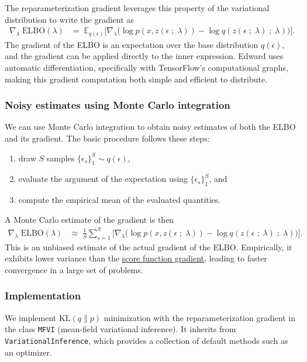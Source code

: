 The reparameterization gradient leverages this property of the
variational distribution to write the gradient as
\begin{align*}
  \nabla_\lambda\;
  \text{ELBO}(\lambda)
  &=\;
  \mathbb{E}_{q(\epsilon)}
  \big[
  \nabla_\lambda
  \big(
  \log p(x, z(\epsilon \;;\; \lambda))
  -
  \log q(z(\epsilon \;;\; \lambda) \;;\;\lambda)
  \big)
  \big].
\end{align*}
The gradient of the ELBO is an expectation over the base
distribution $q(\epsilon)$, and the gradient can be applied directly
to the inner expression.
Edward uses automatic differentiation, specifically with TensorFlow's
computational graphs, making this gradient computation both simple and
efficient to distribute.

\subsubsection{Noisy estimates using Monte Carlo integration}

We can use Monte Carlo integration to obtain noisy estimates of both the ELBO
and its gradient. The basic procedure follows these steps:
\begin{enumerate}
  \item draw $S$ samples $\{\epsilon_s\}_1^S \sim q(\epsilon)$,
  \item evaluate the argument of the expectation using $\{\epsilon_s\}_1^S$, and
  \item compute the empirical mean of the evaluated quantities.
\end{enumerate}

A Monte Carlo estimate of the gradient is then
\begin{align*}
  \nabla_\lambda\;
  \text{ELBO}(\lambda)
  &\approx\;
  \frac{1}{S}
  \sum_{s=1}^{S}
  \big[
  \nabla_\lambda
  \big(
  \log p(x, z(\epsilon \;;\; \lambda))
  -
  \log q(z(\epsilon \;;\; \lambda) \;;\;\lambda)
  \big)
  \big].
\end{align*}
This is an unbiased estimate of the actual gradient of the ELBO. Empirically, it
exhibits lower variance than the
\href{tut_KLqp_score}{score function gradient}, leading to
faster convergence in a large set of problems.

\subsubsection{Implementation}

We implement $\text{KL}(q\|p)$ minimization with the
reparameterization gradient in the class \texttt{MFVI} (mean-field
variational inference). It inherits from
\texttt{VariationalInference}, which
provides a collection of default methods
such as an optimizer.

